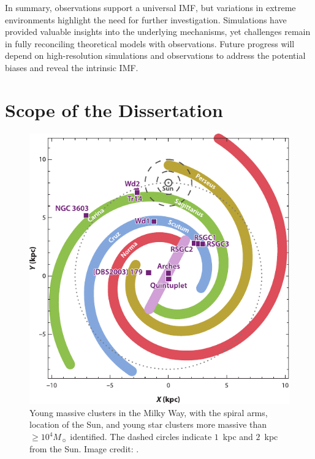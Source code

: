 \documentclass[12pt]{ucsddissertation}
\begin{document}
\begin{CJK*}{UTF8}{gbsn}
In summary, observations support a universal IMF, but variations in extreme environments highlight the need for further investigation. Simulations have provided valuable insights into the underlying mechanisms, yet challenges remain in fully reconciling theoretical models with observations. Future progress will depend on high-resolution simulations and observations to address the potential biases and reveal the intrinsic IMF.


%
%
\section*{Scope of the Dissertation}%

\begin{figure}[htb!]
    \centering
    \includegraphics[width=0.7\linewidth]{figures/intro/Milky-Way.pdf}
    \caption[Young Massive Clusters in the Milky Way]{Young massive clusters in the Milky Way, with the spiral arms, location of the Sun, and young star clusters more massive than $\geq 10^4 M_\sun$ identified. The dashed circles indicate $1$~kpc and $2$~kpc from the Sun. Image credit: \citet{PortegiesZwart-2010}.}
    \label{fig:ymc}
\end{figure}


\end{CJK*}
\end{document}
